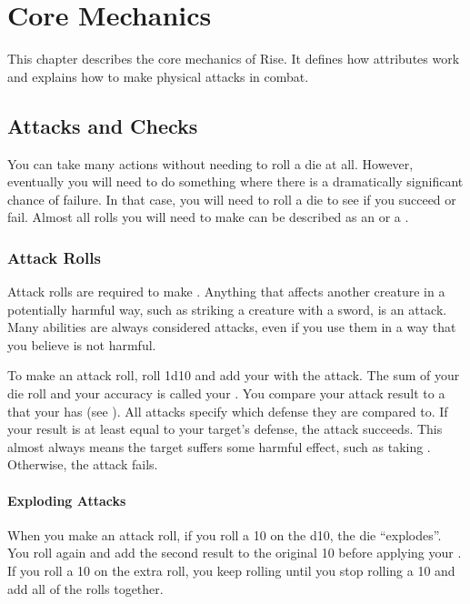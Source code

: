 \chapter{Core Mechanics}

This chapter describes the core mechanics of Rise.
It defines how attributes work and explains how to make physical attacks in combat.

\section{Attacks and Checks}\label{Attacks and Checks}
    You can take many actions without needing to roll a die at all.
    However, eventually you will need to do something where there is a dramatically significant chance of failure.
    In that case, you will need to roll a die to see if you succeed or fail.
    Almost all rolls you will need to make can be described as an  or a .

    \subsection{Attack Rolls}
        Attack rolls are required to make .
        Anything that affects another creature in a potentially harmful way, such as striking a creature with a sword, is an attack.
        Many abilities are always considered attacks, even if you use them in a way that you believe is not harmful.

        To make an attack roll, roll 1d10 and add your  with the attack.
        The sum of your die roll and your accuracy is called your .
        You compare your attack result to a  that your  has (see ).
        All attacks specify which defense they are compared to.
        If your result is at least equal to your target's defense, the attack succeeds.
        This almost always means the target suffers some harmful effect, such as taking .
        Otherwise, the attack fails.

        \subsubsection{Exploding Attacks}\label{Exploding Attacks}
            When you make an attack roll, if you roll a 10 on the d10, the die ``explodes''.
            You roll again and add the second result to the original 10 before applying your .
            If you roll a 10 on the extra roll, you keep rolling until you stop rolling a 10 and add all of the rolls together.

